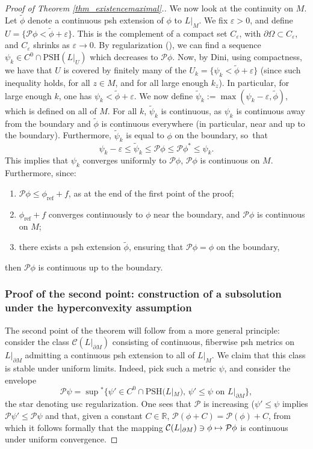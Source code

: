 \documentclass[JEP,XML,SOM,Unicode,NoEqCountersInSection,published]{cedram}
\def\mto{\mathchoice{\longmapsto}{\mapsto}{\mapsto}{\mapsto}}
\theoremstyle{definition}
\newcommand\bbr{\mathbb{R}}
\newcommand\cC{\mathcal{C}}
\newcommand\cP{\mathcal{P}}
\newcommand\PSH{\mathrm{PSH}}
\newcommand\refmetric{\phi_{\mathrm{ref}}}
\begin{document}
\begin{proof}[Proof of Theorem \ref{thm_existencemaximal}.]
We now look at the continuity on $M$. Let $\tilde\phi$ denote a continuous psh extension of $\phi$ to $L|_M$. We fix $\varepsilon>0$, and define $U=\{\cP\phi<\tilde\phi+\varepsilon\}$. This is the complement of a compact set $C_\varepsilon$, with $\partial\Omega\subset C_\varepsilon$, and $C_\varepsilon$ shrinks as $\varepsilon\to 0$. By regularization (\eg \cite[Th.\,3.8]{boul2}), we can find a sequence $\psi_k\in C^0\cap \PSH(L|_{U})$ which decreases to $\cP\phi$. Now, by Dini, using compactness, we have that $U$ is covered by finitely many of the $U_k=\{\psi_k<\tilde\phi+\varepsilon\}$ (since such inequality holds, for all $z\in M$, and for all large enough $k_z$). In particular, for large enough $k$, one has $\psi_k<\tilde\phi+\varepsilon$. We now define $\tilde\psi_k:=\max(\psi_k-\varepsilon,\tilde\phi)$, which is defined on all of $M$. For all $k$, $\tilde\psi_k$ is continuous, as $\psi_k$ is continuous away from the boundary and $\tilde\phi$ is continuous everywhere (in particular, near and up to the boundary). Furthermore, $\tilde\psi_k$ is equal to $\phi$ on the boundary, so~that
\[
\psi_k-\varepsilon\leq\tilde\psi_k\leq \cP\phi \leq \cP\phi^* \leq \psi_k.
\]
This implies that $\psi_k$ converges uniformly to $\cP\phi$, \ie $\cP\phi$ is continuous on $M$. Furthermore, since:
\begin{enumerate}
\item $\cP\phi\leq \refmetric + f$, as at the end of the first point of the proof;
\item $\refmetric + f$ converges continuously to $\phi$ near the boundary, and $\cP\phi$ is continuous on $M$;
\item there exists a psh extension $\tilde\phi$, ensuring that $\cP\phi= \phi$ on the boundary,
\end{enumerate}
then $\cP\phi$ is continuous up to the boundary.

\subsubsection*{Proof of the second point: construction of a subsolution under the hyperconvexity assumption}
The second point of the theorem will follow from a more general principle: consider the class $\cC(L|_{\partial M})$ consisting of continuous, fiberwise psh metrics on $L|_{\partial M}$ admitting a continuous psh extension to all of $L|_M$. We claim that this class is stable under uniform limits. Indeed, pick such a metric $\psi$, and consider the envelope
\[
\cP \psi=\sup{}^*\{\psi'\in C^0\cap \PSH(L|_M),\,\psi'\leq\psi\text{ on }L|_{\partial M}\},
\]
the star denoting usc regularization. One sees that $\cP$ is increasing (\ie $\psi'\leq \psi$ implies $\cP\psi'\leq\cP\psi$ and that, given a constant $C\in\bbr$, $\cP(\phi+C)=\cP(\phi)+C$, from which it follows formally that the mapping $\cC(L|_{\partial M})\ni \phi\mto \cP\phi$ is continuous under uniform convergence.


\end{proof}
\end{document}

